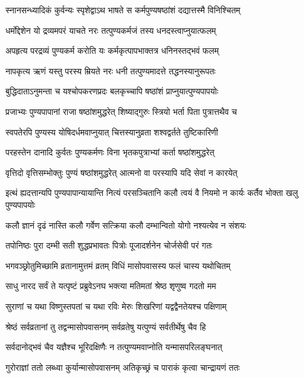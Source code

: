 \twolineshloka
{स्नानसन्ध्यादिकं कुर्वन्यः स्पृशेद्वाऽथ भाषते}
{स कर्मपुण्यषष्ठांशं दद्यात्तस्मै विनिश्चितम्} %

\twolineshloka
{धर्मोद्देशेन यो द्रव्यमपरं याचते नरः}
{तत्पुण्यकर्मजं तस्य धनदस्त्वाप्नुयात्फलम्} %

\twolineshloka
{अपहृत्य परद्रव्यं पुण्यकर्म करोति यः}
{कर्मकृत्पापभाक्तत्र धनिनस्तद्भवं फलम्} %

\twolineshloka
{नापकृत्य ऋणं यस्तु परस्य म्रियते नरः}
{धनी तत्पुण्यमादत्ते तद्धनस्यानुरूपतः} %

\twolineshloka
{बुद्धिदाताऽनुमन्ता च यश्चोपकरणप्रदः}
{बलकृच्चापि षष्ठांशं प्राप्नुयात्पुण्यपापयोः} %

\twolineshloka
{प्रजाभ्यः पुण्यपापानां राजा षष्ठांशमुद्धरेत्}
{शिष्याद्गुरुः स्त्रियो भर्ता पिता पुत्रात्तथैव च} %

\twolineshloka
{स्वपतेरपि पुण्यस्य योषिदर्धमवाप्नुयात्}
{चित्तस्यानुव्रता शश्वद्वर्तते तुष्टिकारिणी} %

\twolineshloka
{परहस्तेन दानादि कुर्वतः पुण्यकर्मणः}
{विना भृतकपुत्राभ्यां कर्ता षष्ठांशमुद्धरेत्} %

\twolineshloka
{वृत्तिदो वृत्तिसम्भोक्तुः पुण्यं षष्ठांशमुद्धरेत्}
{आत्मनो वा परस्यापि यदि सेवां न कारयेत्} %

\twolineshloka
{इत्थं ह्यदत्तान्यपि पुण्यपापान्यायान्ति नित्यं परसञ्चितानि}
{कलौ त्वयं वै नियमो न कार्यः कर्तैव भोक्ता खलु पुण्यपापयोः} %

\twolineshloka
{कलौ ज्ञानं दृढं नास्ति कलौ गर्वेण सत्क्रिया}
{कलौ दम्भान्वितो योगो नश्यत्येव न संशयः} %

\twolineshloka
{तपोनिष्ठः पुरा दम्भी सती शुद्धप्रभावतः}
{पित्रोः पूजादर्शनेन चोर्जसेवी परं गतः} %


\twolineshloka
{भगवञ्छ्रोतुमिच्छामि व्रतानामुत्तमं व्रतम्}
{विधिं मासोपवासस्य फलं चास्य यथोचितम्} %


\twolineshloka
{साधु नारद सर्वं ते यत्पृष्टं प्रब्रुवेऽनघ}
{भक्त्या मतिमतां श्रेष्ठ शृणुष्व गदतो मम} %

\twolineshloka
{सुराणां च यथा विष्णुस्तपतां च यथा रविः}
{मेरुः शिखरिणां यद्वद्वैनतेयश्च पक्षिणाम्} %

\twolineshloka
{श्रेष्ठं सर्वव्रतानां तु तद्वन्मासोपवासनम्}
{सर्वव्रतेषु यत्पुण्यं सर्वतीर्थेषु चैव हि} %

\twolineshloka
{सर्वदानोद्भवं चैव यज्ञैश्च भूरिदक्षिणैः}
{न तत्पुण्यमवाप्नोति यन्मासपरिलङ्घनात्} %

\twolineshloka
{गुरोराज्ञां ततो लब्ध्वा कुर्यान्मासोपवासनम्}
{अतिकृच्छ्रं च पाराकं कृत्वा चान्द्रायणं ततः} %

